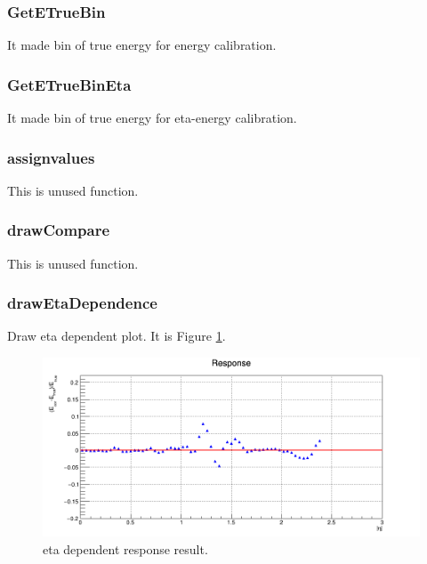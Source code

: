 \documentclass{cernrep}
\begin{document}
\subsubsection {GetETrueBin}

It made bin of true energy for energy calibration.

\subsubsection {GetETrueBinEta}

It made bin of true energy for eta-energy calibration.

\subsubsection {assignvalues}

This is unused function.

\subsubsection {drawCompare}

This is unused function.

\subsubsection {drawEtaDependence}

Draw eta dependent plot. It is Figure \ref{EtaDependent}.

\begin{figure}[!]
\includegraphics[width=1.0\textwidth]{fig/corrEtaDependenceEH_JME_GT_sample.png}
\caption{eta dependent response result.}
\label{EtaDependent}
\end{figure}
\end{document}
